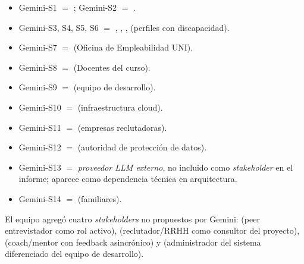\begin{itemize}
  \item Gemini-S1 $=$ ; Gemini-S2 $=$ .
  \item Gemini-S3, S4, S5, S6 $=$ , , , 
        (perfiles con discapacidad).
  \item Gemini-S7 $=$  (Oficina de Empleabilidad UNI).
  \item Gemini-S8 $=$  (Docentes del curso).
  \item Gemini-S9 $=$  (equipo de desarrollo).
  \item Gemini-S10 $=$  (infraestructura cloud).
  \item Gemini-S11 $=$  (empresas reclutadoras).
  \item Gemini-S12 $=$  (autoridad de protección de datos).
  \item Gemini-S13 $=$ \textit{proveedor LLM externo}, no incluido como
        \textit{stakeholder} en el informe; aparece como dependencia
        técnica en arquitectura.
  \item Gemini-S14 $=$  (familiares).
\end{itemize}

\noindent El equipo agregó cuatro \textit{stakeholders} no propuestos
por Gemini:  (peer entrevistador como rol activo), 
(reclutador/RRHH como consultor del proyecto),  (coach/mentor
con feedback asincrónico) y  (administrador del sistema
diferenciado del equipo de desarrollo).
